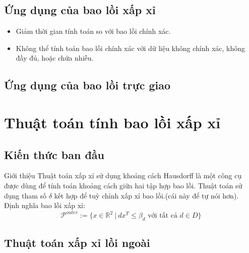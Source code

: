 \documentclass[11pt]{beamer}
\theoremstyle{definition}
\theoremstyle{plain}
\theoremstyle{plain}
\theoremstyle{remark}
\begin{document}
	\subsection{Ứng dụng của bao lồi xấp xỉ}
	\begin{frame}
		\begin{itemize}
				\item Giảm thời gian tính toán so với bao lồi chính xác.
				\item Không thể tính toán bao lồi chính xác với dữ liệu không chính xác, không đầy đủ, hoặc chứa nhiễu.
			\end{itemize}
	\end{frame}
	\subsection{Ứng dụng của bao lồi trực giao}
	\section{Thuật toán tính bao lồi xấp xỉ}
	\subsection{Kiến thức ban đầu}
	\begin{frame}{Giới thiệu}
		Thuật toán xấp xỉ sử dụng khoảng cách Hausdorff là một công cụ được dùng để tính toán khoảng cách giữa hai tập hợp bao lồi.
		Thuật toán sử dụng tham số $\delta$ kết hợp để tuỳ chỉnh xấp xỉ bao lồi.(cái này để tự nói hơn).\\
			Định nghĩa bao lồi xấp xỉ:
		\begin{equation}
			\mathcal{P}^{outer} := \{x \in \mathbb{R}^2 \ | \ d x^T \leq \beta_d \text{ với tất cả } d \in D\}
		\end{equation}
	\end{frame}	
		\subsection{Thuật toán xấp xỉ lồi ngoài}
\end{document}
